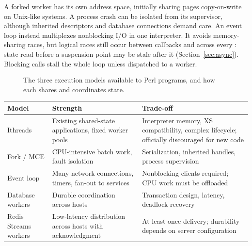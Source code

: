 \documentclass[11pt,openany]{book}
\makeatletter
\renewcommand{\arraystretch}{1.20}
\DeclareRobustCommand{\code}[1]{\texttt{\expandafter\code@quotes\expandafter{\detokenize{#1}}}}
\newcommand{\code@quotes}[1]{\saveexpandmode\expandarg
  \StrSubstitute{#1}{'}{\noexpand\textquotesingle}[\code@tmp]%
  \StrSubstitute{\code@tmp}{`}{\noexpand\textasciigrave}[\code@tmp]%
  \StrSubstitute{\code@tmp}{::}{::\noexpand\allowbreak}[\code@tmp]%
  \restoreexpandmode\code@tmp}
\makeatother
\begin{document}
A forked worker has its own address space, initially sharing pages copy-on-write on Unix-like systems. A process crash can be isolated from its supervisor, although inherited descriptors and database connections demand care. An event loop instead multiplexes nonblocking I/O in one interpreter. It avoids memory-sharing races, but logical races still occur between callbacks and across every \code{await}: state read before a suspension point may be stale after it (Section~\ref{sec:async}). Blocking calls stall the whole loop unless dispatched to a worker.
\begin{figure}[H]\centering\begin{adjustbox}{max width=\linewidth}\end{adjustbox}\caption{The three execution models available to Perl programs, and how each shares and coordinates state.}\label{fig:execmodels}\end{figure}
\begingroup\small\renewcommand{\arraystretch}{1.02}
\begin{longtable}{L{.22\linewidth}L{.36\linewidth}L{.34\linewidth}}
\toprule Model & Strength & Trade-off \\ \midrule\endhead
Ithreads & Existing shared-state applications, fixed worker pools & Interpreter memory, XS compatibility, complex lifecycle; officially discouraged for new code \\
Fork / MCE & CPU-intensive batch work, fault isolation & Serialization, inherited handles, process supervision \\
Event loop & Many network connections, timers, fan-out to services & Nonblocking clients required; CPU work must be offloaded \\
Database workers & Durable coordination across hosts & Transaction design, latency, deadlock recovery \\
Redis Streams workers & Low-latency distribution across hosts with acknowledgment & At-least-once delivery; durability depends on server configuration \\
\bottomrule
\end{longtable}
\endgroup
\end{document}
